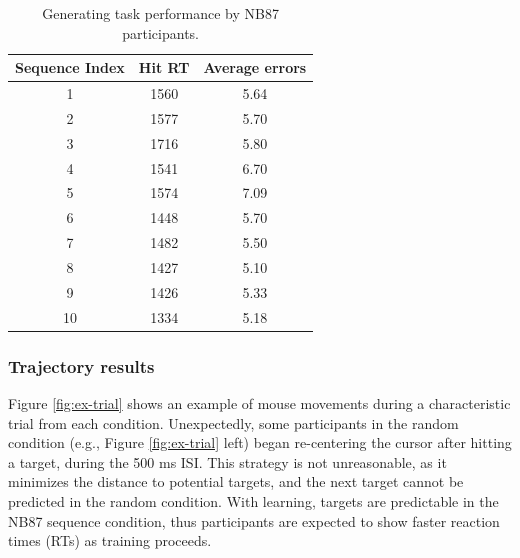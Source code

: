 \documentclass[man,floatsintext]{apa6}
\begin{document}
\begin{table}[h]
\begin{center} 
\caption{Generating task performance by NB87 participants.} 
\label{test-table} 
\vskip 0.12in
\begin{tabular}{c c c} 
\hline
Sequence Index  &  Hit RT  &  Average errors  \\ %
\hline
1  &  1560 &  5.64  \\
2  &  1577 &  5.70  \\
3  &  1716 &  5.80  \\
4  &  1541 &  6.70  \\ 
5  &  1574 &  7.09  \\ 
6  &  1448 &  5.70  \\ 
7  &  1482 &  5.50  \\ 
8  &  1427 &  5.10  \\ 
9  &  1426 &  5.33  \\ 
10 & 1334 &  5.18  \\
\hline
\end{tabular} 
\end{center} 
\end{table} 


\subsubsection{Trajectory results}

Figure \ref{fig:ex-trial} shows an example of mouse movements during a characteristic trial from each condition. Unexpectedly, some participants in the random condition (e.g., Figure \ref{fig:ex-trial} left) began re-centering the cursor after hitting a target, during the 500 ms ISI. This strategy is not unreasonable, as it minimizes the distance to potential targets, and the next target cannot be predicted in the random condition. With learning, targets are predictable in the NB87 sequence condition, thus participants are expected to show faster reaction times (RTs) as training proceeds.
\end{document}
